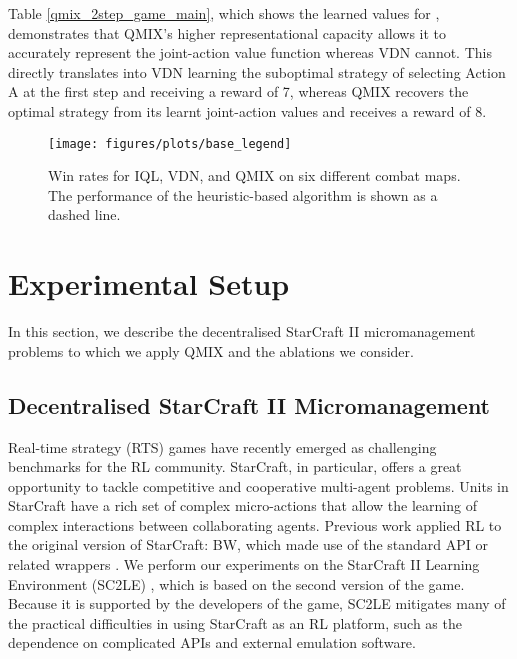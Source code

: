 \documentclass{article}
\begin{document}
Table \ref{qmix_2step_game_main}, which shows the learned values for , demonstrates that QMIX's higher representational capacity allows it to accurately represent the joint-action value function whereas VDN cannot. This directly translates into VDN learning the suboptimal strategy of selecting Action A at the first step and receiving a reward of 7, whereas QMIX recovers the optimal strategy from its learnt joint-action values and receives a reward of 8. 

\begin{figure*}[htb!]
    \centering
    \texttt{[image: figures/plots/base\_legend]}
    \vfill
    \\
    \caption{Win rates for IQL, VDN, and QMIX on six different combat maps. The performance of the heuristic-based algorithm is shown as a dashed line.}
    \label{fig:starcraft_res}
\end{figure*}

\section{Experimental Setup}
\label{sec:setting}

In this section, we describe the decentralised StarCraft II micromanagement problems to which we apply QMIX and the ablations we consider.

\subsection{Decentralised StarCraft II Micromanagement} 
Real-time strategy (RTS) games have recently emerged as challenging benchmarks for the RL community. 
StarCraft, in particular, offers a great opportunity to tackle competitive and cooperative multi-agent problems.
Units in StarCraft have a rich set of complex micro-actions that allow the learning of complex interactions between collaborating agents. 
Previous work \cite{usunier_episodic_2016, foerster_counterfactual_2017, peng_multiagent_2017} applied RL to the original version of StarCraft: BW, which made use of the standard API or related wrappers \cite{synnaeve_torchcraft_2016}. 
We perform our experiments on the StarCraft II Learning Environment (SC2LE) \cite{vinyals_starcraft_2017}, which is based on the second version of the game. 
Because it is supported by the developers of the game, SC2LE mitigates many of the practical difficulties in using StarCraft as an RL platform, such as the dependence on complicated APIs and external emulation software.
\end{document}
